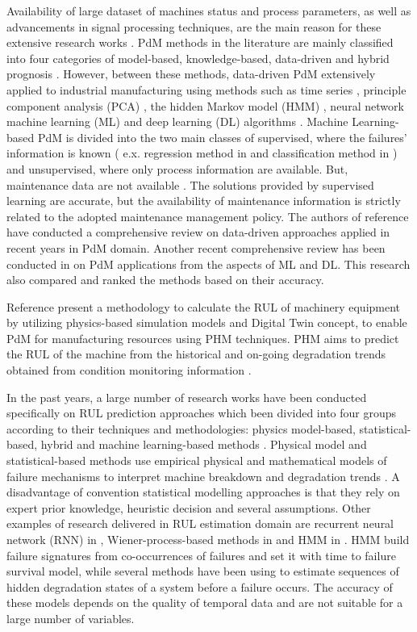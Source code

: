 \documentclass[conference]{IEEEtran}
\begin{document}
Availability of large dataset of machines status and process parameters, as well as advancements in signal processing techniques, are the main reason for these extensive research works \cite{Susto2015}. PdM methods in the literature are mainly classified into four categories of model-based, knowledge-based, data-driven and hybrid prognosis \cite{Liao2014}. However, between these methods, data-driven PdM extensively applied to industrial manufacturing using methods such as time series \cite{Lin2019}, principle component analysis (PCA) \cite{You2015}, the hidden Markov model (HMM) \cite{Vrignat2015}, neural network \cite{Malhi2011} machine learning (ML) \cite{Jiang2018,Carvalho2019} and deep learning (DL) algorithms \cite{Zhao2019,Namuduri2020,Li2019a}. Machine Learning-based PdM is divided into the two main classes of supervised, where the failures’ information is known ( e.x. regression method in \cite{Kumar2019} and classiﬁcation method in \cite{Canizo2017}) and unsupervised, where only process information are available. But, maintenance data are not available \cite{Jiang2018}. The solutions provided by supervised learning are accurate, but the availability of maintenance information is strictly related to the adopted maintenance management policy. The authors of reference \cite{Lei2018} have conducted a comprehensive review on data-driven approaches applied in recent years in PdM domain. Another recent comprehensive review has been conducted in \cite{Zhang2019} on PdM applications from the aspects of ML and DL. This research also compared and ranked the methods based on their accuracy.

Reference \cite{Aivaliotis2019} present a methodology to calculate the RUL of machinery equipment by utilizing physics-based simulation models and Digital Twin concept, to enable PdM for manufacturing resources using PHM techniques. PHM aims to predict the RUL of the machine from the historical and on-going degradation trends obtained from condition monitoring information \cite{Li2020}.

In the past years, a large number of research works have been conducted specifically on RUL prediction approaches which been divided into four groups according to their techniques and methodologies: physics model-based, statistical-based, hybrid and machine learning-based methods \cite{Jiang2018,Lei2018,Aivaliotis2019,Li2020}. Physical model and statistical-based methods use empirical physical and mathematical models of failure mechanisms to interpret machine breakdown and degradation trends \cite{Cai2020,Zhang2020,Ahmad2019}. A disadvantage of convention statistical modelling approaches is that they rely on expert prior knowledge, heuristic decision and several assumptions. Other examples of research delivered in RUL estimation domain are recurrent neural network (RNN) in \cite{Guo2017}, Wiener-process-based methods in \cite{Zhang2018} and HMM in \cite{Vrignat2015,Chen2019}. HMM build failure signatures from co-occurrences of failures and set it with time to failure survival model, while several methods have been using to estimate sequences of hidden degradation states of a system before a failure occurs. The accuracy of these models depends on the quality of temporal data and are not suitable for a large number of variables.
\end{document}
